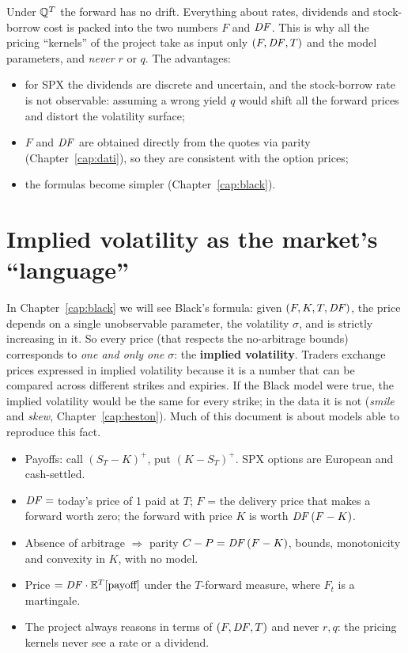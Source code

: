 \begin{idea}[title={Key idea: working with the forward}]
Under $\mathbb{Q}^T$ the forward has no drift. Everything about rates, dividends and stock-borrow cost is packed into the two
numbers $F$ and $\mathit{DF}$. This is why all the pricing ``kernels'' of the project take as input only $(F,\mathit{DF},T)$ and the
model parameters, and \emph{never} $r$ or $q$. The advantages:
\begin{itemize}
\item for SPX the dividends are discrete and uncertain, and the stock-borrow rate is not observable: assuming a wrong
yield $q$ would shift all the forward prices and distort the volatility surface;
\item $F$ and $\mathit{DF}$ are obtained directly from the quotes via parity (Chapter~\ref{cap:dati}), so they are
consistent with the option prices;
\item the formulas become simpler (Chapter~\ref{cap:black}).
\end{itemize}
\end{idea}

\section{Implied volatility as the market's ``language''}
In Chapter~\ref{cap:black} we will see Black's formula: given $(F,K,T,\mathit{DF})$, the price depends on a single
unobservable parameter, the volatility $\sigma$, and is strictly increasing in it. So every price (that respects the
no-arbitrage bounds) corresponds to \emph{one and only one} $\sigma$: the \textbf{implied volatility}. Traders
exchange prices expressed in implied volatility because it is a number that can be compared across different strikes
and expiries. If the Black model were true, the implied volatility would be the same for every strike; in the data it
is not (\emph{smile} and \emph{skew}, Chapter~\ref{cap:heston}). Much of this document is about models able to
reproduce this fact.

\begin{riassunto}
\begin{itemize}
\item Payoffs: call $(S_T-K)^+$, put $(K-S_T)^+$. SPX options are European and cash-settled.
\item $\mathit{DF}={}$today's price of 1 paid at $T$; $F$ = the delivery price that makes a forward worth zero; the forward
with price $K$ is worth $\mathit{DF}\,(F-K)$.
\item Absence of arbitrage $\Rightarrow$ parity $C-P=\mathit{DF}\,(F-K)$, bounds, monotonicity and convexity in $K$, with no
model.
\item Price $=\mathit{DF}\cdot\mathbb{E}^T[\text{payoff}]$ under the $T$-forward measure, where $F_t$ is a martingale.
\item The project always reasons in terms of $(F,\mathit{DF},T)$ and never $r,q$: the pricing kernels never see a rate or a
dividend.
\end{itemize}
\end{riassunto}

